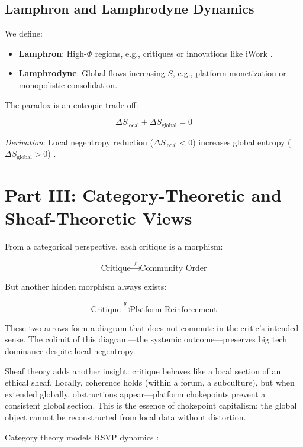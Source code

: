 \documentclass{article}
\begin{document}
\subsection{Lamphron and Lamphrodyne Dynamics}

We define:

\begin{itemize}
    \item \textbf{Lamphron}: High-$\Phi$ regions, e.g., critiques or innovations like iWork \cite{doctorow2023internetcon}.
    \item \textbf{Lamphrodyne}: Global flows increasing $S$, e.g., platform monetization or monopolistic consolidation.
\end{itemize}

The paradox is an entropic trade-off:

\[
\Delta S_{\text{local}} + \Delta S_{\text{global}} = 0
\]

\emph{Derivation}: Local negentropy reduction ($\Delta S_{\text{local}} < 0$) increases global entropy ($\Delta S_{\text{global}} > 0$) \cite{shannon1948}.

\section{Part III: Category-Theoretic and Sheaf-Theoretic Views}

From a categorical perspective, each critique is a morphism:

\[
\text{Critique} \xrightarrow{\;\;f\;\;} \text{Community Order}
\]

But another hidden morphism always exists:

\[
\text{Critique} \xrightarrow{\;\;g\;\;} \text{Platform Reinforcement}
\]

These two arrows form a diagram that does not commute in the critic’s intended sense. The colimit of this diagram—the systemic outcome—preserves big tech dominance despite local negentropy.

Sheaf theory adds another insight: critique behaves like a local section of an ethical sheaf. Locally, coherence holds (within a forum, a subculture), but when extended globally, obstructions appear—platform chokepoints prevent a consistent global section. This is the essence of chokepoint capitalism: the global object cannot be reconstructed from local data without distortion.

Category theory models RSVP dynamics \cite{lawvere2009}:
\end{document}
